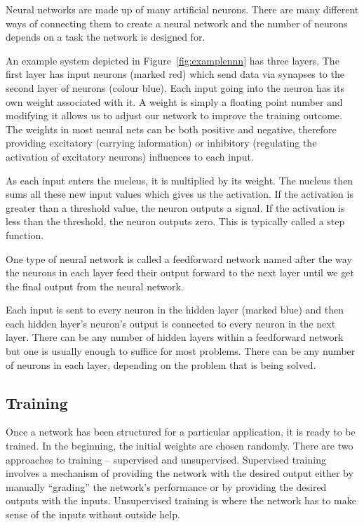 Neural networks are made up of many artificial neurons. There are many different ways of connecting them to create a neural network and the number of neurons depends on a task the network is designed for.

An example system depicted in Figure~\ref{fig:examplennn} has three layers. The first layer has input neurons (marked red) which send data via synapses to the second layer of neurons (colour blue). Each input going into the neuron has its own weight associated with it. A weight is simply a floating point number and modifying it allows us to adjust our network to improve the training outcome. The weights in most neural nets can be both positive and negative, therefore providing excitatory (carrying information) or inhibitory (regulating the activation of excitatory neurons) influences to each input. 

As each input enters the nucleus, it is multiplied by its weight. The nucleus then sums all these new input values which gives us the activation. If the activation is greater than a threshold value, the neuron outputs a signal. If the activation is less than the threshold, the neuron outputs zero. This is typically called a step function.

One type of neural network is called a feedforward network named after the way the neurons in each layer feed their output forward to the next layer until we get the final output from the neural network. 
 
Each input is sent to every neuron in the hidden layer (marked blue) and then each hidden layer’s neuron’s output is connected to every neuron in the next layer. There can be any number of hidden layers within a feedforward network but one is usually enough to suffice for most problems. There can be any number of neurons in each layer, depending on the problem that is being solved.

\vspace{10pt}

\subsection{Training}
Once a network has been structured for a particular application, it is ready to be trained. In the beginning, the initial weights are chosen randomly. 
There are two approaches to training -- supervised and unsupervised. Supervised training involves a mechanism of providing the network with the desired output either by manually ``grading'' the network's performance or by providing the desired outputs with the inputs. Unsupervised training is where the network has to make sense of the inputs without outside help.

